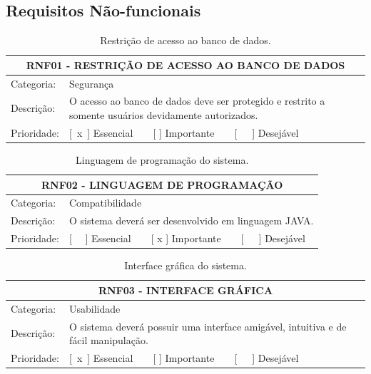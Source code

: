 \begin{anexosenv}
\chapter{Requisitos Não-funcionais}

\begin{table}[htbp]
	\centering
	\caption{Restrição de acesso ao banco de dados.}
	\label{tab:rnf01}
	\begin{tabular}{l p{10cm}}
		\toprule
		\multicolumn{2}{c}{RNF01 - RESTRIÇÃO DE ACESSO AO BANCO DE DADOS} \\ \midrule
		Categoria:  & Segurança\\ \midrule
		Descrição:  & O acesso ao banco de dados deve ser protegido e restrito a somente usuários devidamente autorizados.\\ \midrule
		Prioridade: & [ x ] Essencial    [   ] Importante    [   ] Desejável \\ \bottomrule
	\end{tabular}
\end{table}

\begin{table}[htbp]
	\centering
	\caption{Linguagem de programação do sistema.}
	\label{tab:rnf02}
	\begin{tabular}{l p{10cm}}
		\toprule
		\multicolumn{2}{c}{RNF02 - LINGUAGEM DE PROGRAMAÇÃO} \\ \midrule
		Categoria:  & Compatibilidade\\ \midrule
		Descrição:  & O sistema deverá ser desenvolvido em linguagem JAVA.\\ \midrule
		Prioridade: & [   ] Essencial    [ x ] Importante    [   ] Desejável \\ \bottomrule
	\end{tabular}
\end{table}

\begin{table}[htbp]
	\centering
	\caption{Interface gráfica do sistema.}
	\label{tab:rnf03}
	\begin{tabular}{l p{10cm}}
		\toprule
		\multicolumn{2}{c}{RNF03 - INTERFACE GRÁFICA} \\ \midrule
		Categoria:  & Usabilidade\\ \midrule
		Descrição:  & O sistema deverá possuir uma interface amigável, intuitiva e de fácil manipulação.\\ \midrule
		Prioridade: & [ x ] Essencial    [   ] Importante    [   ] Desejável \\ \bottomrule
	\end{tabular}
\end{table}


\end{anexosenv}
